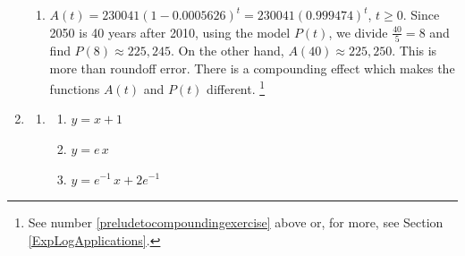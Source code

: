 \documentclass{ximera}
\begin{document}
\begin{enumerate}
\begin{enumerate}
\item  $A(t) = 230041(1 - 0.0005626)^{t} =  230041 (0.999474)^{t}$, $t \geq 0$.  Since 2050 is 40 years after 2010, using the model $P(t)$, we divide $\frac{40}{5} = 8$ and find $P(8) \approx 225,245$. On the other hand, $A(40) \approx 225,250$.  This is more than roundoff error.  There is a compounding effect which makes the functions $A(t)$ and $P(t)$ different. \footnote{See number \ref{preludetocompoundingexercise} above or, for more, see Section \ref{ExpLogApplications}.}

\end{enumerate}

\addtocounter{enumi}{3}

\enlargethispage{0.25in}

\item  \begin{enumerate}
\addtocounter{enumii}{3}

\item \begin{multicols}{3} \begin{enumerate} \item $y = x+1$ \item  $y = e \, x $  \item  $y = e^{-1} \, x + 2e^{-1}$  \end{enumerate}  \end{multicols} \end{enumerate}


\setcounter{HW}{\value{enumi}}
\end{enumerate}
\end{document}
